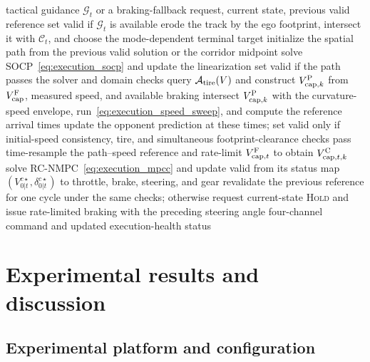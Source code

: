 \documentclass[sensors,article,submit,moreauthors]{Definitions/mdpi}
\begin{document}
\begin{algorithm}[!tbp]
\caption{Sequential SOCP and RC-NMPC Execution}
\label{alg:executor}
\footnotesize
\begin{algorithmic}[1]
\REQUIRE tactical guidance \(\mathcal G_t\) or a braking-fallback request,
current state, previous valid reference
\STATE set valid if $\mathcal G_t$ is available
\STATE erode the track by the ego footprint, intersect it with $\mathcal C_t$,
and choose the mode-dependent terminal target
\STATE initialize the spatial path from the previous valid solution or the
corridor midpoint
\STATE solve SOCP~\eqref{eq:execution_socp} and update the linearization
\ENDFOR
\STATE set valid if the path passes the solver and domain checks
\ENDIF
{}
\STATE query $\mathcal A_{\rm tire}(V)$ and construct
$V_{{\rm cap},k}^{\rm P}$ from $V_{\rm cap}^{\rm F}$, measured speed, and
available braking
\STATE intersect $V_{{\rm cap},k}^{\rm P}$ with the curvature-speed envelope,
run~\eqref{eq:execution_speed_sweep}, and compute the reference arrival times
\STATE update the opponent prediction at these times; set valid only if
initial-speed consistency, tire, and simultaneous footprint-clearance checks pass
\ENDIF
{}
\STATE time-resample the path--speed reference and rate-limit
$V_{{\rm cap},t}^{\rm F}$ to obtain $V_{{\rm cap},t,k}^{\rm C}$
\STATE solve RC-NMPC~\eqref{eq:execution_mpcc} and update valid from its status
\ENDIF
{}
\STATE map $(V_{0|t}^{c\star},\delta_{0|t}^{c\star})$ to throttle, brake,
steering, and gear
\ELSE
\STATE revalidate the previous reference for one cycle under the same checks; otherwise request
current-state \textsc{Hold} and issue rate-limited braking with the preceding
steering angle
\ENDIF
\RETURN four-channel command and updated execution-health status
\end{algorithmic}
\end{algorithm}
\endgroup


\section{Experimental results and discussion}\label{sec:experiments}

\subsection{Experimental platform and configuration}
\label{subsec:hil_env}\label{subsec:param_setup}
\end{document}
